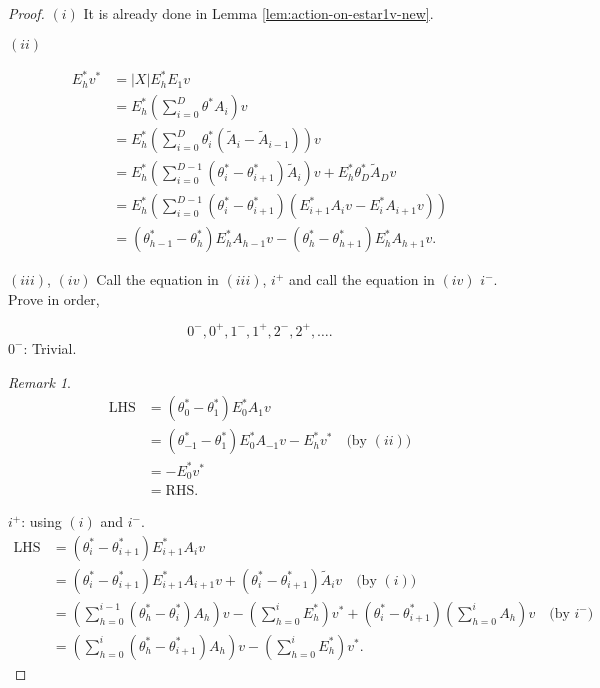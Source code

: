 \documentclass[
]{book}
\theoremstyle{definition}
\theoremstyle{definition}
\theoremstyle{definition}
\theoremstyle{definition}
\theoremstyle{remark}
\newtheorem*{remark}{Remark}
\begin{document}
\begin{proof}
\leavevmode

\((i)\) It is already done in Lemma \ref{lem:action-on-estar1v-new}.

\((ii)\)

\begin{align}
E^*_hv^* & = |X|E^*_hE_1v\\
& = E^*_h\left(\sum_{i=0}^D\theta^*A_i\right)v\\
& = E^*_h\left(\sum_{i=0}^D\theta^*_i(\tilde{A}_i-\tilde{A}_{i-1})\right)v\\
& = E^*_h\left(\sum_{i=0}^{D-1}(\theta^*_i-\theta^*_{i+1})\tilde{A}_i\right)v + E^*_h\theta^*_D\tilde{A}_D v\\
& = E^*_h\left(\sum_{i=0}^{D-1}(\theta^*_i-\theta^*_{i+1})(E^*_{i+1}A_iv - E^*_iA_{i+1}v)\right)\\
& = (\theta^*_{h-1}-\theta^*_h)E^*_hA_{h-1}v - (\theta^*_h-\theta^*_{h+1})E^*_hA_{h+1}v.
\end{align}

\((iii)\), \((iv)\) Call the equation in \((iii)\), \(i^+\) and call the equation in \((iv)\) \(i^-\). Prove in order,

\[0^-, 0^+, 1^-, 1^+, 2^-, 2^+, \ldots .\]
\(0^-\): Trivial.

\begin{remark}
\begin{align}
\mathrm{LHS} & = (\theta^*_0 - \theta^*_1)E^*_0A_1v \\
& = (\theta^*_{-1}-\theta^*_1)E^*_0A_{-1}v - E^*_hv^* \quad \text{(by $(ii)$)}\\
& = -E^*_0v^*\\
& = \mathrm{RHS}.
\end{align}
\end{remark}

\(i^+\): using \((i)\) and \(i^-\).
\begin{align}
\mathrm{LHS} & = (\theta^*_i - \theta^*_{i+1})E^*_{i+1}A_iv \\
& = (\theta^*_{i}-\theta^*_{i+1})E^*_{i+1}A_{i+1}v + (\theta^*_i-\theta^*_{i+1})\tilde{A}_iv \quad \text{(by $(i)$)}\\
& = \left(\sum_{h=0}^{i-1}(\theta^*_h-\theta^*_{i})A_h\right)v - \left(\sum_{h=0}^i E^*_h\right)v^* + (\theta^*_i-\theta^*_{i+1})\left(\sum_{h=0}^i A_h\right)v \quad \text{(by $i^-$)}\\
& = \left(\sum_{h=0}^i (\theta^*_h-\theta^*_{i+1})A_h\right)v - \left(\sum_{h=0}^i E^*_h\right)v^*.
\end{align}


\end{proof}
\end{document}
